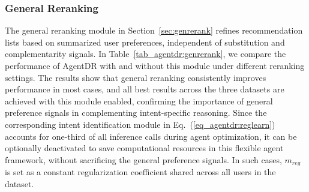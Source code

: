 \subsubsection{General Reranking}
The general reranking module in Section~\ref{sec:genrerank} refines recommendation lists based on summarized user preferences, independent of substitution and complementarity signals. In Table~\ref{tab_agentdr:genrerank}, we compare the performance of AgentDR with and without this module under different reranking settings. The results show that general reranking consistently improves performance in most cases, and all best results across the three datasets are achieved with this module enabled, confirming the importance of general preference signals in complementing intent-specific reasoning. Since the corresponding intent identification module in Eq.~(\ref{eq_agentdr:reglearn}) accounts for one-third of all inference calls during agent optimization, it can be optionally deactivated to save computational resources in this flexible agent framework, without sacrificing the general preference signals. In such cases, $m_{reg}$ is set as a constant regularization coefficient shared across all users in the dataset.

\begin{table}
\caption{Performance of AgentDR with and without general reranking.}
\label{tab_agentdr:genrerank}
\end{table}


